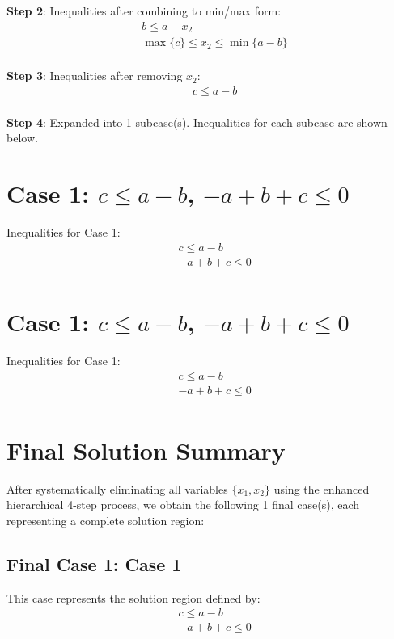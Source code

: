 \documentclass{article}
\begin{document}
\textbf{Step 2}: Inequalities after combining to min/max form:
\begin{align}
& b \leq a - x_{2} \\
& \max\{c\} \leq x_{2} \leq \min\{a - b\} \\
\end{align}

\textbf{Step 3}: Inequalities after removing $x_{2}$:
\begin{align}
& c \leq a - b \\
\end{align}

\textbf{Step 4}: Expanded into 1 subcase(s). Inequalities for each subcase are shown below.

\section{Case 1: $c \leq a - b$, $- a + b + c \leq 0$}

Inequalities for Case 1:
\begin{align}
& c \leq a - b \\
& - a + b + c \leq 0 \\
\end{align}

\section{Case 1: $c \leq a - b$, $- a + b + c \leq 0$}

Inequalities for Case 1:
\begin{align}
& c \leq a - b \\
& - a + b + c \leq 0 \\
\end{align}

\section{Final Solution Summary}

After systematically eliminating all variables $\{x_{1}, x_{2}\}$
using the enhanced hierarchical 4-step process, we obtain the following
1 final case(s), each representing a complete solution region:

\subsection{Final Case 1: Case 1}

This case represents the solution region defined by:
\begin{align}
& c \leq a - b \\
& - a + b + c \leq 0 \\
\end{align}
\end{document}
